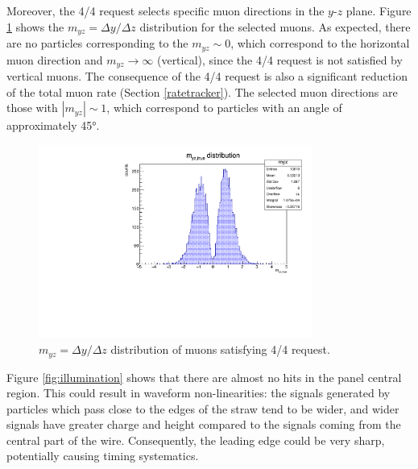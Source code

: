 Moreover, the 4/4 request selects specific 
muon directions in the $y$-$z$ plane. 
Figure \ref{fig:myz} shows the 
$m_{yz}=\Delta y /\Delta z$ distribution 
for the selected muons. 
As expected, there are no particles corresponding 
to the $m_{yz}\sim 0$, which correspond to the  
horizontal muon direction and 
$m_{yz} \rightarrow \infty$ (vertical), since the 
4/4 request is not satisfied by vertical muons. 
The consequence of the 4/4 request is also a 
significant reduction of the total muon rate 
(Section \ref{ratetracker}). 
The selected muon  
directions are those with 
$|m_{yz}| \sim 1$, which correspond to  
particles with 
an angle of approximately 45°.
\begin{figure}[!h]
    \centering
    \includegraphics[width =0.8\textwidth]{figures/pdf/myz.pdf}
    \caption[The $y-z$ direction 
    distribution of muons satisfying 4/4 request.]{
        $m_{yz}=\Delta y /\Delta z$  
    distribution of muons satisfying 4/4 request.}
    \label{fig:myz}
\end{figure}

Figure \ref{fig:illumination} 
shows that there are almost no hits in the 
panel central region. This could result in 
waveform non-linearities: the signals generated by 
particles which pass close to the edges of 
the straw tend to be wider, and wider signals 
have greater charge and height compared 
to the signals coming from the 
central part of the wire. Consequently, the leading 
edge could be very sharp, potentially 
causing timing systematics. 

